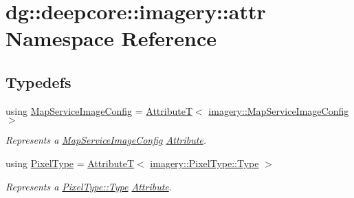 \hypertarget{namespacedg_1_1deepcore_1_1imagery_1_1attr}{}\section{dg\+:\+:deepcore\+:\+:imagery\+:\+:attr Namespace Reference}
\label{namespacedg_1_1deepcore_1_1imagery_1_1attr}
\subsection*{Typedefs}
\begin{DoxyCompactItemize}
\item 
using \hyperlink{group___imagery_attributes_gac05046a81d3ec2c6f4cd6ecba9c88018}{Map\+Service\+Image\+Config} = \hyperlink{structdg_1_1deepcore_1_1_attribute_t}{AttributeT}$<$ \hyperlink{structdg_1_1deepcore_1_1imagery_1_1_map_service_image_config}{imagery\+::\+Map\+Service\+Image\+Config} $>$
\begin{DoxyCompactList}\small\item\em Represents a \hyperlink{structdg_1_1deepcore_1_1imagery_1_1_map_service_image_config}{Map\+Service\+Image\+Config} \hyperlink{classdg_1_1deepcore_1_1_attribute}{Attribute}. \end{DoxyCompactList}\item 
using \hyperlink{group___imagery_attributes_gaa884544bf20ab4b9900b402d9243a4d0}{Pixel\+Type} = \hyperlink{structdg_1_1deepcore_1_1_attribute_t}{AttributeT}$<$ \hyperlink{namespacedg_1_1deepcore_1_1imagery_1_1_pixel_type_a5f0c62edf4601cbd15e52b381697069d}{imagery\+::\+Pixel\+Type\+::\+Type} $>$
\begin{DoxyCompactList}\small\item\em Represents a \hyperlink{namespacedg_1_1deepcore_1_1imagery_1_1_pixel_type_a5f0c62edf4601cbd15e52b381697069d}{Pixel\+Type\+::\+Type} \hyperlink{classdg_1_1deepcore_1_1_attribute}{Attribute}. \end{DoxyCompactList}\end{DoxyCompactItemize}
